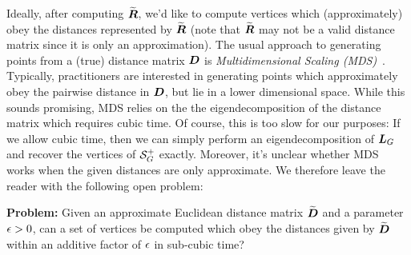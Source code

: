 Ideally, after computing  $\widetilde{\vb*{R}}$, we'd like to compute vertices which (approximately) obey the  distances represented by $\widetilde{\vb*{R}}$ (note  that $\widetilde{\vb*{R}}$ may not be a valid distance matrix since it  is only an approximation). The usual approach to generating points from a (true) distance matrix $\vb*{D}$ is \emph{Multidimensional Scaling (MDS)}~\cite{kruskal1978multidimensional}. Typically, practitioners are interested  in  generating points which approximately  obey the pairwise distance in  $\vb*{D}$, but  lie in a lower dimensional space. 
While  this sounds promising, MDS relies on the the eigendecomposition of the distance matrix which requires cubic time. Of  course, this is too slow for our  purposes:  If we allow cubic time, then we can simply perform an  eigendecomposition of $\vb*{L}_G$ and recover the vertices of $\mathcal{S}_G^+$ exactly. Moreover, it's unclear whether MDS works when  the given distances are  only approximate. 
We therefore  leave the reader with  the  following open problem:  

\noindent\textbf{Problem:} Given an approximate Euclidean distance matrix $\widetilde{\vb*{D}}$ and a parameter  $\epsilon>0$, can a set of vertices be computed which  obey  the distances given by $\widetilde{\vb*{D}}$ within an additive factor of $\epsilon$  in sub-cubic time? 










